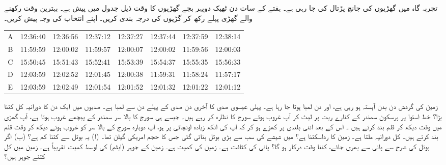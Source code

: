   تجربہ گاہ میں گھڑیوں کی  جانچ پڑتال کی جا رہی ہے۔  ہفتے کے سات دن ٹھیک دوپہر    بجے  گھڑیوں کا وقت  ذیل جدول میں  پیش ہے۔  بہترین وقت رکھنے والے گھڑی پہلے  رکھ کر گڑیوں کی درجہ بندی کریں۔ اپنے انتخاب کی وجہ پیش کریں۔
\begin{center}
\begin{tabular}{CCCCCCCC}
\toprule
{} &  &  &  &  &  &  &   \\
\midrule
A&12:36:40 &12:36:56 &12:37:12 &12:37:27 &12:37:44 &12:37:59 &12:38:14\\
B&11:59:59 &12:00:02 &11:59:57 &12:00:07 &12:00:02 &11:59:56 &12:00:03\\
C&15:50:45 &15:51:43 &15:52:41 &15:53:39 &15:54:37 &15:55:35 &15:56:33\\
D&12:03:59 &12:02:52 &12:01:45 &12:00:38 &11:59:31 &11:58:24 &11:57:17\\
E&12:03:59 &12:02:49 &12:01:54 &12:01:52 &12:01:32&12:01:22 &12:01:12\\
\bottomrule
\end{tabular}
\end{center}
زمین کی گردش دن بدن آہستہ ہو رہی ہے، اور دن لمبا ہوتا جا رہا ہے۔ پہلی عیسوی صدی کا آخری دن   صدی کے پہلے دن سے  لمبا ہے۔  صدیوں میں ایک دن کا دورانیہ کل  کتنا بڑا؟
  خط استوا پر  پرسکون سمندر کے کنارے ریت پر لیٹ کر آپ  غروب ہوتے سورج کا نظارہ کر رہے ہیں۔ جیسے ہی سورج کا بالا  سر سمندر کے پیچھے غروب ہوتا ہے،  آپ گھڑی میں وقت دیکھ کر قلم بند کرتے ہیں ۔ اس کے بعد  اتنی بلندی پر کھڑے ہو کر کہ آپ کی آنکھ زیادہ اونچائی پر ہو،  آپ دوبارہ سورج کے بالا سر کو غروب ہوتے دیکھ کر وقت قلم بند کرتے ہیں۔ کل دورانیہ ملتا ہے۔ زمین کا رداسکتنا ہے؟ 
 میں شیشے کی سب سے بڑی بوتل بنائی گئی جس کا حجم امریکی  گیلن تھا۔ 
(ا) یہ   بوتل  سے کتنا کم ہے؟  (ب)  اگر  بوتل   کی شرح سے پانی سے بھری  جائے،  کتنا  وقت درکار ہو  گا؟  پانی کی کثافت ہے۔ 
زمین کی کمیت ہے۔ زمین کے  جوہر   (ایٹم) کی اوسط کمیت تقریباً   ہے۔ زمین میں کل کتنے  جوہر  ہیں؟ 
